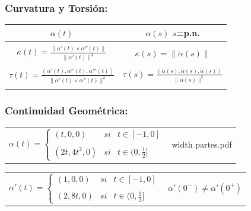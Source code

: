 \documentclass[twoside]{report}
\newcommand{\colocapdf}[2]{\quad\pdfimage width #2 {#1.pdf}}
\begin{document}
\subsubsection{Curvatura y Torsión:}

\begin{center}
\begin{tabular}{|c||c|}
\hline
$\alpha(t)$ & $\alpha(s)$ \quad $s$=p.n. \\
\hline \hline
 & \\
$\displaystyle \kappa(t)= \frac{\parallel \alpha'(t)\times\alpha''
(t)\parallel}{\parallel
\alpha'(t)\parallel ^3}$ & $\displaystyle \kappa(s)=\parallel \ddot{\alpha}(s)\parallel$\\
 & \\
$\displaystyle \tau (t)= \frac{(\alpha' (t),\alpha'' (t),\alpha'''
(t))}{\parallel\alpha' (t)\times\alpha'' (t)\parallel^2}$ &
$\displaystyle \tau (s)=\frac{( \dot{\alpha}(s),\ddot{\alpha}(s),
\stackrel{...}{\alpha}(s))}{\parallel \ddot{\alpha}(s)\parallel^2 }$ \\
 & \\
\hline
\end{tabular}
\end{center}

\subsubsection{Continuidad Geométrica:}

\begin{tabular}{cc}
$\alpha(t)=\left\{\begin{array}{ccc}
(t,0,0) & si & t\in [-1,0]\\
 & & \\
(2t,4t^2,0) & si & t\in (0, \frac{1}{2}]
\end{array}\right.$ & \begin{minipage}{.4\textwidth}\colocapdf{partes}{\textwidth}\end{minipage}
\end{tabular}

\vspace{0.3cm}

\begin{tabular}{cc}
$\alpha'(t)=\left\{\begin{array}{ccc}
(1,0,0) & si & t\in [-1,0]\\
 & & \\
(2,8t,0) & si & t\in (0, \frac{1}{2}]
\end{array}\right.$ & \hspace{1cm} $\alpha'(0^{-})\neq \alpha'(0^{+})$
\end{tabular}
\end{document}
